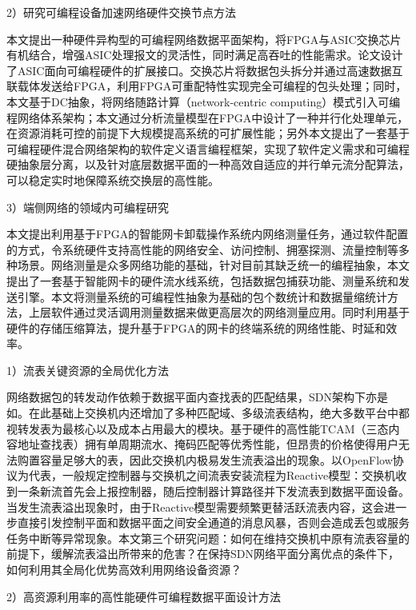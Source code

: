 2）研究可编程设备加速网络硬件交换节点方法

本文提出一种硬件异构型的可编程网络数据平面架构，将FPGA与ASIC交换芯片有机结合，增强ASIC处理报文的灵活性，同时满足高吞吐的性能需求。论文设计了ASIC面向可编程硬件的扩展接口。交换芯片将数据包头拆分并通过高速数据互联载体发送给FPGA，利用FPGA可重配特性实现完全可编程的包头处理；同时，本文基于DC抽象，将网络随路计算（network-centric computing）模式引入可编程网络体系架构；本文通过分析流量模型在FPGA中设计了一种并行化处理单元，在资源消耗可控的前提下大规模提高系统的可扩展性能；另外本文提出了一套基于可编程硬件混合网络架构的软件定义语言编程框架，实现了软件定义需求和可编程硬抽象层分离，以及针对底层数据平面的一种高效自适应的并行单元流分配算法，可以稳定实时地保障系统交换层的高性能。


3）端侧网络的领域内可编程研究

本文提出利用基于FPGA的智能网卡卸载操作系统内网络测量任务，通过软件配置的方式，令系统硬件支持高性能的网络安全、访问控制、拥塞探测、流量控制等多种场景。网络测量是众多网络功能的基础，针对目前其缺乏统一的编程抽象，本文提出了一套基于智能网卡的硬件流水线系统，包括数据包捕获功能、测量系统和发送引擎。本文将测量系统的可编程性抽象为基础的包个数统计和数据量缩统计方法，上层软件通过灵活调用测量数据来做更高层次的网络测量应用。同时利用基于硬件的存储压缩算法，提升基于FPGA的网卡的终端系统的网络性能、时延和效率。





\label{chap13}

1）流表关键资源的全局优化方法

网络数据包的转发动作依赖于数据平面内查找表的匹配结果，SDN架构下亦是如。在此基础上交换机内还增加了多种匹配域、多级流表结构，绝大多数平台中都视转发表为最核心以及成本占用最大的模块。基于硬件的高性能TCAM（三态内容地址查找表）拥有单周期流水、掩码匹配等优秀性能，但昂贵的价格使得用户无法购置容量足够大的表，因此交换机内极易发生流表溢出的现象。以OpenFlow协议为代表，一般规定控制器与交换机之间流表安装流程为Reactive模型：交换机收到一条新流首先会上报控制器，随后控制器计算路径并下发流表到数据平面设备。当发生流表溢出现象时，由于Reactive模型需要频繁更替活跃流表内容，这会进一步直接引发控制平面和数据平面之间安全通道的消息风暴，否则会造成丢包或服务任务中断等异常现象。本文第三个研究问题：如何在维持交换机中原有流表容量的前提下，缓解流表溢出所带来的危害？在保持SDN网络平面分离优点的条件下，如何利用其全局化优势高效利用网络设备资源？

2）高资源利用率的高性能硬件可编程数据平面设计方法

